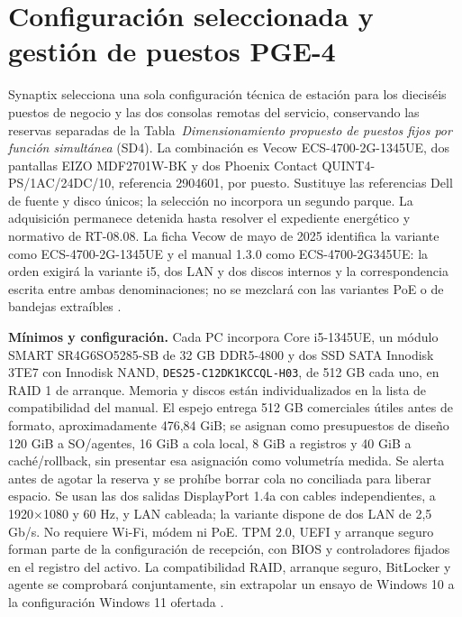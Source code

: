 \section{Configuración seleccionada y gestión de puestos PGE-4}
\label{sec:sd4-pge4-puestos}
Synaptix selecciona una sola configuración técnica de estación para los dieciséis puestos de negocio y las dos consolas remotas del servicio, conservando las reservas separadas de la Tabla~\emph{Dimensionamiento propuesto de puestos fijos por función simultánea} (SD4). La combinación es Vecow ECS-4700-2G-1345UE, dos pantallas EIZO MDF2701W-BK y dos Phoenix Contact QUINT4-PS/1AC/24DC/10, referencia 2904601, por puesto. Sustituye las referencias Dell de fuente y disco únicos; la selección no incorpora un segundo parque. La adquisición permanece detenida hasta resolver el expediente energético y normativo de RT-08.08. La ficha Vecow de mayo de 2025 identifica la variante como ECS-4700-2G-1345UE y el manual 1.3.0 como ECS-4700-2G345UE: la orden exigirá la variante i5, dos LAN y dos discos internos y la correspondencia escrita entre ambas denominaciones; no se mezclará con las variantes PoE o de bandejas extraíbles \parencites{p9-vecow-datasheet-2025,p6-puestos-vecow-manual,p6-puestos-eizo,p6-puestos-quint}.

\textbf{Mínimos y configuración.} Cada PC incorpora Core i5-1345UE, un módulo SMART SR4G6SO5285-SB de 32 GB DDR5-4800 y dos SSD SATA Innodisk 3TE7 con Innodisk NAND, \texttt{DES25-C12DK1KCCQL-H03}, de 512 GB cada uno, en RAID 1 de arranque. Memoria y discos están individualizados en la lista de compatibilidad del manual. El espejo entrega 512 GB comerciales útiles antes de formato, aproximadamente 476,84 GiB; se asignan como presupuestos de diseño 120 GiB a SO/agentes, 16 GiB a cola local, 8 GiB a registros y 40 GiB a caché/rollback, sin presentar esa asignación como volumetría medida. Se alerta antes de agotar la reserva y se prohíbe borrar cola no conciliada para liberar espacio. Se usan las dos salidas DisplayPort 1.4a con cables independientes, a 1920$\times$1080 y 60 Hz, y LAN cableada; la variante dispone de dos LAN de 2,5 Gb/s. No requiere Wi-Fi, módem ni PoE. TPM 2.0, UEFI y arranque seguro forman parte de la configuración de recepción, con BIOS y controladores fijados en el registro del activo. La compatibilidad RAID, arranque seguro, BitLocker y agente se comprobará conjuntamente, sin extrapolar un ensayo de Windows 10 a la configuración Windows 11 ofertada \parencites[pp.~7--8, 93--98 y 104--105]{p6-puestos-vecow-manual}{p9-vecow-datasheet-2025}.

